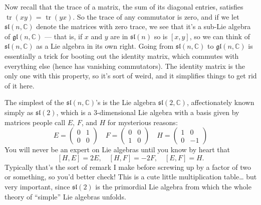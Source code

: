 \documentclass{article}
\begin{document}
Now recall that the trace of a matrix, the sum of its diagonal entries,
satisfies \(\operatorname{tr}(xy)\) = \(\operatorname{tr}(yx)\). So the
trace of any commutator is zero, and if we let
\(\mathfrak{sl}(n,\mathbb{C})\) denote the matrices with zero trace, we
see that it's a sub-Lie algebra of \(\mathfrak{gl}(n,\mathbb{C})\) ---
that is, if \(x\) and \(y\) are in \(\mathfrak{sl}(n)\) so is \([x,y]\),
so we can think of \(\mathfrak{sl}(n,\mathbb{C})\) as a Lie algebra in
its own right. Going from \(\mathfrak{sl}(n,\mathbb{C})\) to
\(\mathfrak{gl}(n,\mathbb{C})\) is essentially a trick for booting out
the identity matrix, which commutes with everything else (hence has
vanishing commutators). The identity matrix is the only one with this
property, so it's sort of weird, and it simplifies things to get rid of
it here.

The simplest of the \(\mathfrak{sl}(n,\mathbb{C})\)'s is the Lie algebra
\(\mathfrak{sl}(2,\mathbb{C})\), affectionately known simply as
\(\mathfrak{sl}(2)\), which is a \(3\)-dimensional Lie algebra with a
basis given by matrices people call \(E\), \(F\), and \(H\) for
mysterious reasons:
\[E=\left(\begin{array}{cc}0&1\\0&0\end{array}\right) \quad F=\left(\begin{array}{cc}0&0\\1&0\end{array}\right) \quad H=\left(\begin{array}{cc}1&0\\0&-1\end{array}\right)\]
You will never be an expert on Lie algebras until you know by heart that
\[[H,E] = 2E, \quad [H,F] = -2F, \quad [E,F]  = H.\] Typically that's
the sort of remark I make before screwing up by a factor of two or
something, so you'd better check! This is a cute little multiplication
table\ldots{} but very important, since \(\mathfrak{sl}(2)\) is the
primordial Lie algebra from which the whole theory of ``simple'' Lie
algebras unfolds.
\end{document}
